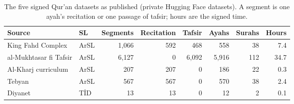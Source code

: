 \begin{table}[ht]
\centering
\small
\caption{The five signed Qur'an datasets as published (private Hugging Face datasets). A segment is one ayah's recitation or one passage of tafsir; hours are the signed time.}
\label{tab:quran_sets}
\begin{tabular}{llrrrrrr}
\toprule
Source & SL & Segments & Recitation & Tafsir & Ayahs & Surahs & Hours \\
\midrule
King Fahd Complex & ArSL & 1,066 & 592 & 468 & 558 & 38 & 7.4 \\
al-Mukhtasar fi Tafsir & ArSL & 6,127 & 0 & 6,092 & 5,916 & 112 & 34.7 \\
Al-Kharj curriculum & ArSL & 207 & 207 & 0 & 186 & 22 & 0.3 \\
Tebyan & ArSL & 567 & 567 & 0 & 570 & 38 & 2.4 \\
Diyanet & TİD & 13 & 13 & 0 & 12 & 2 & 0.1 \\
\bottomrule
\end{tabular}
\end{table}
